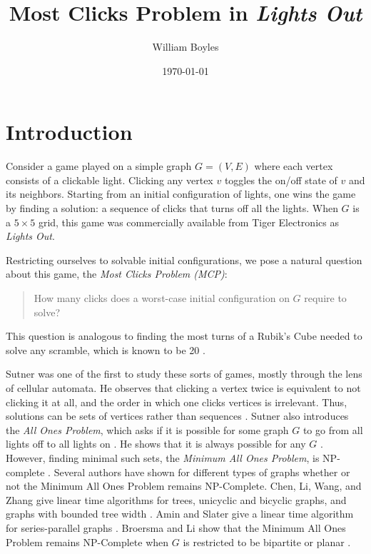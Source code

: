 \documentclass[a4paper]{article}
\begin{document}
	\title{Most Clicks Problem in \textit{Lights Out}}
	\author{William Boyles}
	\date{\today}
	\maketitle
	
	\section{Introduction}
	Consider a game played on a simple graph $G=(V,E)$ where each vertex consists of a clickable light.
	Clicking any vertex $v$ toggles the on/off state of $v$ and its neighbors.
	Starting from an initial configuration of lights, one wins the game by finding a solution: a sequence of clicks that turns off all the lights.
	When $G$ is a $5 \times 5$ grid, this game was commercially available from Tiger Electronics as \textit{Lights Out}.
	
	Restricting ourselves to solvable initial configurations, we pose a natural question about this game, the \textit{Most Clicks Problem (MCP)}:
	\begin{quote}
		How many clicks does a worst-case initial configuration on $G$ require to solve?
	\end{quote}
	This question is analogous to finding the most turns of a Rubik's Cube needed to solve any scramble, which is known to be 20 \cite{Rockiki2013}.
	
	
	Sutner was one of the first to study these sorts of games, mostly through the lens of cellular automata.
	He observes that clicking a vertex twice is equivalent to not clicking it at all, and the order in which one clicks vertices is irrelevant.
	Thus, solutions can be sets of vertices rather than sequences \cite{Sutner1989}.
	Sutner also introduces the \textit{All Ones Problem}, which asks if it is possible for some graph $G$ to go from all lights off to all lights on \cite{Sutner1988}.
	He shows that it is always possible for any $G$ \cite{Sutner1989}.
	However, finding minimal such sets, the \textit{Minimum All Ones Problem}, is NP-complete \cite{Sutner1988}.
	Several authors have shown for different types of graphs whether or not the Minimum All Ones Problem remains NP-Complete.
	Chen, Li, Wang, and Zhang give linear time algorithms for trees, unicyclic and bicyclic graphs, and graphs with bounded tree width \cite{CHEN200493}.
	Amin and Slater give a linear time algorithm for series-parallel graphs \cite{AminSlater1992}.
	Broersma and Li show that the Minimum All Ones Problem remains NP-Complete when $G$ is restricted to be bipartite or planar \cite{BROERSMA200760}.
	
\end{document}
